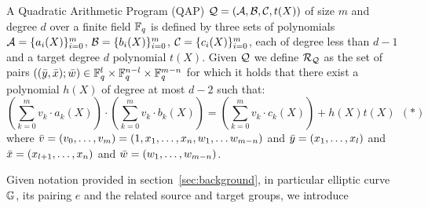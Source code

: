 \begin{definition}[QAP] 
\label{def:QAP}
A Quadratic Arithmetic Program (QAP) $\mathcal{Q} = (\mathcal{A}, \mathcal{B}, \mathcal{C}, t(X))$ of size $m$ 
and degree $d$ over a finite field $\mathbb{F}_q$ is defined by three sets of polynomials $\mathcal{A} = \{a_i(X)\}_{i=0}^m$, 
$\mathcal{B} = \{b_i(X)\}_{i=0}^m$, $\mathcal{C} = \{c_i(X)\}_{i=0}^m$, each of degree less than $d-1$ and a target degree $d$ polynomial $t(X)$. Given 
$\mathcal{Q}$ we define $\mathcal{R}_{\mathcal{Q}}$ as the set of pairs $((\bar{y}, \bar{x}); \bar{w}) \in \mathbb{F}_q^{l} \times \mathbb{F}_q^{n-l} \times \mathbb{F}_q^{m-n}$ for which it 
holds that there exist a polynomial $h(X)$ of degree at most $d-2$ such that:
$$(\sum_{k=0}^m v_k \cdot a_k(X)) \cdot (\sum_{k=0}^m v_k \cdot b_k(X)) = (\sum_{k=0}^m v_k \cdot c_k(X)) + h(X)t(X) \ \ (\ast)$$ 
where $\bar{v} = (v_0, \ldots, v_m) = (1, x_1, \ldots, x_n, w_1, \ldots w_{m-n})$ and $\bar{y} = (x_1, \ldots, x_l)$ and 
$\bar{x} = (x_{l+1}, \ldots, x_n)$ and $\bar{w} = (w_1, \ldots, w_{m-n})$. 
\end{definition}

\noindent Given notation provided in section~\ref{sec:background}, in particular elliptic curve ${\mathbb{G}}$, its pairing $e$ and 
the related source and target groups, we introduce%

